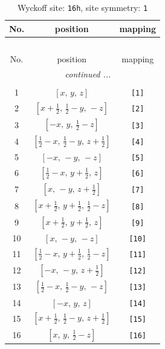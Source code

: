 \documentclass[fleqn,8pt]{jsarticle}
\begin{document}
\begin{longtable}{ccc}
\caption{Wyckoff site: {\tt 16h}, site symmetry: {\tt 1}}
 \\
 \hline \hline
No. & position & mapping \\ \hline \endfirsthead

\multicolumn{2}{l}{\tablename\ \thetable{}} \\
 \hline \hline
No. & position & mapping \\ \hline \endhead

 \hline \hline
\multicolumn{2}{r}{\footnotesize\it continued ...} \\ \endfoot

 \hline \hline
\multicolumn{2}{r}{} \\ \endlastfoot

1 & $\left[ x,\, y,\, z \right]$ & {\tt [1]} \\ \hline
2 & $\left[ x + \frac{1}{2},\, \frac{1}{2} - y,\, - z \right]$ & {\tt [2]} \\ \hline
3 & $\left[ - x,\, y,\, \frac{1}{2} - z \right]$ & {\tt [3]} \\ \hline
4 & $\left[ \frac{1}{2} - x,\, \frac{1}{2} - y,\, z + \frac{1}{2} \right]$ & {\tt [4]} \\ \hline
5 & $\left[ - x,\, - y,\, - z \right]$ & {\tt [5]} \\ \hline
6 & $\left[ \frac{1}{2} - x,\, y + \frac{1}{2},\, z \right]$ & {\tt [6]} \\ \hline
7 & $\left[ x,\, - y,\, z + \frac{1}{2} \right]$ & {\tt [7]} \\ \hline
8 & $\left[ x + \frac{1}{2},\, y + \frac{1}{2},\, \frac{1}{2} - z \right]$ & {\tt [8]} \\ \hline
9 & $\left[ x + \frac{1}{2},\, y + \frac{1}{2},\, z \right]$ & {\tt [9]} \\ \hline
10 & $\left[ x,\, - y,\, - z \right]$ & {\tt [10]} \\ \hline
11 & $\left[ \frac{1}{2} - x,\, y + \frac{1}{2},\, \frac{1}{2} - z \right]$ & {\tt [11]} \\ \hline
12 & $\left[ - x,\, - y,\, z + \frac{1}{2} \right]$ & {\tt [12]} \\ \hline
13 & $\left[ \frac{1}{2} - x,\, \frac{1}{2} - y,\, - z \right]$ & {\tt [13]} \\ \hline
14 & $\left[ - x,\, y,\, z \right]$ & {\tt [14]} \\ \hline
15 & $\left[ x + \frac{1}{2},\, \frac{1}{2} - y,\, z + \frac{1}{2} \right]$ & {\tt [15]} \\ \hline
16 & $\left[ x,\, y,\, \frac{1}{2} - z \right]$ & {\tt [16]} \\
\end{longtable}
\end{document}
